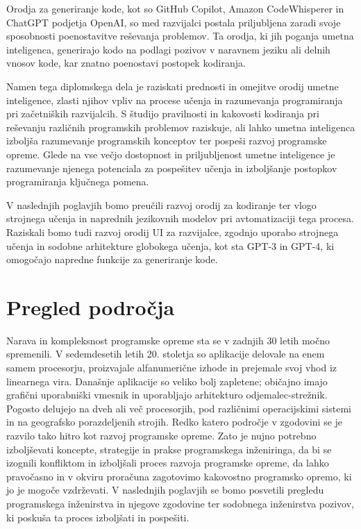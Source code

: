 \documentclass[a4paper,12pt,openright]{book}
\begin{document}
Orodja za generiranje kode, kot so GitHub Copilot, Amazon CodeWhisperer in ChatGPT podjetja OpenAI, so med razvijalci postala priljubljena zaradi svoje sposobnosti poenostavitve reševanja problemov. Ta orodja, ki jih poganja umetna inteligenca, generirajo kodo na podlagi pozivov v naravnem jeziku ali delnih vnosov kode, kar znatno poenostavi postopek kodiranja.

Namen tega diplomskega dela je raziskati prednosti in omejitve orodij umetne inteligence, zlasti njihov vpliv na procese učenja in razumevanja programiranja  pri začetniških razvijalcih. S študijo pravilnosti in kakovosti kodiranja pri reševanju različnih programskih problemov raziskuje, ali lahko umetna inteligenca izboljša razumevanje programskih konceptov ter pospeši razvoj programske opreme. Glede na vse večjo dostopnost in priljubljenost umetne inteligence je razumevanje njenega potenciala za pospešitev učenja in izboljšanje postopkov programiranja ključnega pomena.

V naslednjih poglavjih bomo preučili razvoj orodij za kodiranje ter vlogo strojnega učenja in naprednih jezikovnih modelov pri avtomatizaciji tega procesa. Raziskali bomo tudi razvoj orodij UI za razvijalce, zgodnjo uporabo strojnega učenja in sodobne arhitekture globokega učenja, kot sta GPT-3 in GPT-4, ki omogočajo napredne funkcije za generiranje kode.



\chapter{Pregled področja}
Narava in kompleksnost programske opreme sta se v zadnjih 30 letih močno spremenili. V sedemdesetih letih 20. stoletja so aplikacije delovale na enem samem procesorju, proizvajale alfanumerične izhode in prejemale svoj vhod iz linearnega vira. \cite{aggarwal2005software} Današnje aplikacije so veliko bolj zapletene; običajno imajo grafični uporabniški vmesnik in uporabljajo arhitekturo odjemalec-strežnik. Pogosto delujejo na dveh ali več procesorjih, pod različnimi operacijskimi sistemi in na geografsko porazdeljenih strojih.\cite{Wasserman_Engineering} Redko katero področje v zgodovini se je  razvilo tako hitro kot razvoj programske opreme. 
Zato je nujno potrebno izboljševati koncepte, strategije in prakse programskega inženiringa, da bi se izognili konfliktom in izboljšali proces razvoja programske opreme, da lahko pravočasno in v okviru proračuna zagotovimo kakovostno programsko opremo, ki jo je mogoče vzdrževati.
V naslednjih poglavjih se bomo posvetili pregledu programskega inženirstva in njegove zgodovine ter sodobnega inženirstva pozivov, ki poskuša ta proces izboljšati in pospešiti.
\end{document}

